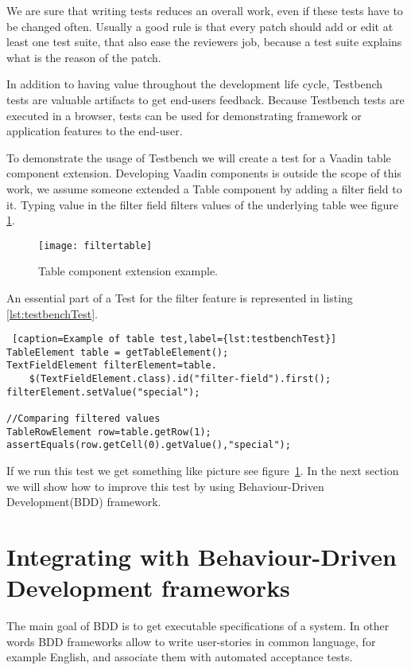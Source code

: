  We are sure that writing tests reduces an overall work,
 even if these tests have to be changed often.
 Usually a good rule is that every patch should add or edit at least one test suite, that
 also ease the reviewers job, because a test suite explains what is the reason of the patch. 

In addition to having value throughout the development life cycle,
Testbench tests are valuable artifacts to get end-users feedback.
Because Testbench tests are executed in a browser, tests can be used 
for demonstrating framework or application features to the end-user. 
  
To demonstrate the usage of Testbench we will create a test for a Vaadin table
component extension. Developing Vaadin components is outside the scope of
this work, we assume someone extended a Table component by adding a filter field to
it. Typing value in the filter field filters values of the underlying table wee
figure \ref{fig:filtertable}.
	\begin{figure}
	\label{fig:filtertable}
	\texttt{[image: filtertable]}
	\caption{Table component extension example.}
	\end{figure}

An essential  part of a Test for the filter feature is represented in listing
\ref{lst:testbenchTest}. 

 \lstset{style=a1listing}
  \begin{lstlisting} [caption=Example of table test,label={lst:testbenchTest}]
TableElement table = getTableElement();
TextFieldElement filterElement=table.
	$(TextFieldElement.class).id("filter-field").first();
filterElement.setValue("special");

//Comparing filtered values
TableRowElement row=table.getRow(1);
assertEquals(row.getCell(0).getValue(),"special");
  \end{lstlisting}

If we run this test we get something like picture see
figure~\ref{fig:filtertable}.
In the next section we will show how to improve this test by using
Behaviour-Driven Development(BDD) framework.

\section{Integrating with Behaviour-Driven Development frameworks}

The main goal of BDD is to get executable specifications of a system.
In other words BDD frameworks allow  to write user-stories in
common language, for example English, and associate them with automated
acceptance tests.

